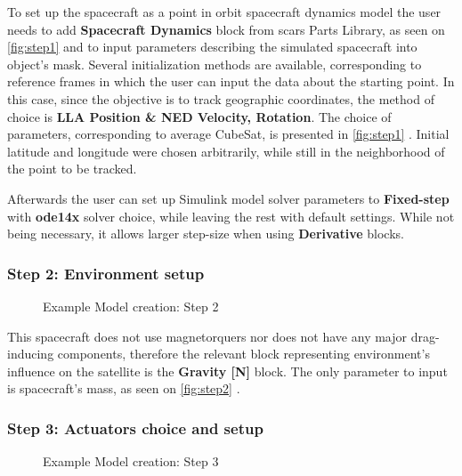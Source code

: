             To set up the spacecraft as a point in orbit spacecraft dynamics model the user needs to add \textbf{Spacecraft Dynamics} block from \ac{scars} Parts Library, as seen on \autoref{fig:step1}  and to input parameters describing the simulated spacecraft into object's mask. Several initialization methods are available, corresponding to reference frames in which the user can input the data about the starting point. In this case, since the objective is to track geographic coordinates, the method of choice is \textbf{LLA Position \& NED Velocity, Rotation}. The choice of parameters, corresponding to average CubeSat, is presented in \autoref{fig:step1} . Initial latitude and longitude were chosen arbitrarily, while still in the neighborhood of the point to be tracked.
            
            Afterwards the user can set up Simulink model solver parameters to \textbf{Fixed-step} with \textbf{ode14x} solver choice, while leaving the rest with default settings. While not being necessary, it allows larger step-size when using \textbf{Derivative} blocks.

        \subsubsection*{Step 2: Environment setup}
            \begin{figure}[H]
                \centering
                \quad
                \caption{Example Model creation: Step 2}%
                \label{fig:step2}%
            \end{figure}

            This spacecraft does not use magnetorquers nor does not have any major drag-inducing components, therefore the relevant block representing environment's influence on the satellite is the \textbf{Gravity [N]} block. The only parameter to input is spacecraft's mass, as seen on \autoref{fig:step2} .

        \subsubsection*{Step 3: Actuators choice and setup}
            \begin{figure}[H]
                \centering
                \quad
                \caption{Example Model creation: Step 3}%
                \label{fig:step3}%
            \end{figure}


